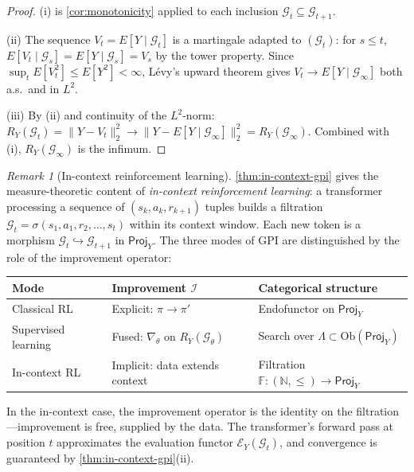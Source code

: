 \documentclass[12pt]{amsart}
\theoremstyle{definition}
\theoremstyle{remark}
\newtheorem*{remark}{Remark}
\newcommand{\Proj}{\mathsf{Proj}}
\begin{document}
\begin{proof}
(i) is \cref{cor:monotonicity} applied to each inclusion
$\mathcal{G}_t \subseteq \mathcal{G}_{t+1}$.

(ii) The sequence $V_t = E[Y \mid \mathcal{G}_t]$ is a martingale
adapted to $(\mathcal{G}_t)$: for $s \leq t$,
$E[V_t \mid \mathcal{G}_s] = E[Y \mid \mathcal{G}_s] = V_s$ by the tower
property. Since $\sup_t E[V_t^2] \leq E[Y^2] < \infty$, L\'{e}vy's upward
theorem \cite[Theorem~4.4.5]{Durrett} gives
$V_t \to E[Y \mid \mathcal{G}_\infty]$ both a.s.\ and in $L^2$.

(iii) By (ii) and continuity of the $L^2$-norm:
$R_Y(\mathcal{G}_t) = \|Y - V_t\|_2^2 \to
\|Y - E[Y \mid \mathcal{G}_\infty]\|_2^2 = R_Y(\mathcal{G}_\infty)$.
Combined with (i), $R_Y(\mathcal{G}_\infty)$ is the infimum.
\end{proof}

\begin{remark}[In-context reinforcement learning]\label{rmk:in-context-rl}
\cref{thm:in-context-gpi} gives the measure-theoretic content of
\emph{in-context reinforcement learning}: a transformer processing a
sequence of $(s_k, a_k, r_{k+1})$ tuples builds a filtration
$\mathcal{G}_t = \sigma(s_1, a_1, r_2, \ldots, s_t)$ within its context
window. Each new token is a morphism
$\mathcal{G}_t \hookrightarrow \mathcal{G}_{t+1}$ in $\Proj_Y$. The three
modes of GPI are distinguished by the role of the improvement operator:

\medskip
\begin{center}
\renewcommand{\arraystretch}{1.25}
\small
\begin{tabular}{@{}p{}p{}p{}@{}}
\hline
\textbf{Mode} & \textbf{Improvement $\mathcal{I}$} & \textbf{Categorical structure} \\
\hline
Classical RL & Explicit: $\pi \to \pi'$ & Endofunctor on $\Proj_Y$ \\
Supervised learning & Fused: $\nabla_\theta$ on $R_Y(\mathcal{G}_\theta)$ & Search over $\Lambda \subset \mathrm{Ob}(\Proj_Y)$ \\
In-context RL & Implicit: data extends context & Filtration $\mathbb{F} : (\mathbb{N}, \leq) \to \Proj_Y$ \\
\hline
\end{tabular}
\normalsize
\end{center}
\medskip

\noindent In the in-context case, the improvement operator is the identity
on the filtration---improvement is free, supplied by the data. The
transformer's forward pass at position $t$ approximates the evaluation
functor $\mathcal{E}_Y(\mathcal{G}_t)$, and convergence is guaranteed by
\cref{thm:in-context-gpi}(ii).
\end{remark}
\end{document}
